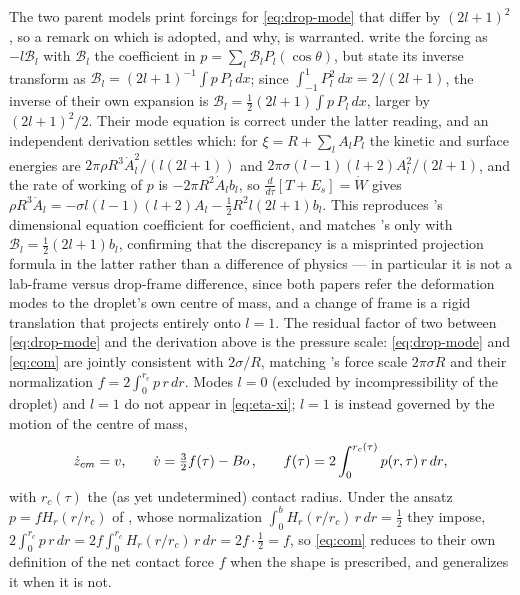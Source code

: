 The two parent models print forcings for \eqref{eq:drop-mode} that differ by $(2l+1)^2$, so a remark on which is adopted, and why, is warranted. \cite{AgueroEtAl2026} write the forcing as $-l\mathcal B_l$ with $\mathcal B_l$ the coefficient in $p=\sum_l\mathcal B_lP_l(\cos\theta)$, but state its inverse transform as $\mathcal B_l=(2l+1)^{-1}\int p\,P_l\,dx$; since $\int_{-1}^1P_l^2\,dx=2/(2l+1)$, the inverse of their own expansion is $\mathcal B_l=\tfrac12(2l+1)\int p\,P_l\,dx$, larger by $(2l+1)^2/2$. Their mode equation is correct under the latter reading, and an independent derivation settles which: for $\xi=R+\sum_lA_lP_l$ the kinetic and surface energies are $2\pi\rho R^3\dot A_l^2/(l(2l+1))$ and $2\pi\sigma(l-1)(l+2)A_l^2/(2l+1)$, and the rate of working of $p$ is $-2\pi R^2\dot A_lb_l$, so $\tfrac{d}{d\tau}[T+E_s]=\dot W$ gives $\rho R^3\ddot A_l=-\sigma l(l-1)(l+2)A_l-\tfrac12R^2l(2l+1)b_l$. This reproduces \cite{AlventosaEtAl2023}'s dimensional equation coefficient for coefficient, and matches \cite{AgueroEtAl2026}'s only with $\mathcal B_l=\tfrac12(2l+1)b_l$, confirming that the discrepancy is a misprinted projection formula in the latter rather than a difference of physics --- in particular it is not a lab-frame versus drop-frame difference, since both papers refer the deformation modes to the droplet's own centre of mass, and a change of frame is a rigid translation that projects entirely onto $l=1$. The residual factor of two between \eqref{eq:drop-mode} and the derivation above is the pressure scale: \eqref{eq:drop-mode} and \eqref{eq:com} are jointly consistent with $2\sigma/R$, matching \cite{AlventosaEtAl2023}'s force scale $2\pi\sigma R$ and their normalization $f=2\int_0^{r_c}p\,r\,dr$. Modes $l=0$ (excluded by incompressibility of the droplet) and $l=1$ do not appear in \eqref{eq:eta-xi}; $l=1$ is instead governed by the motion of the centre of mass,
\begin{equation}
    \dot z_{cm} = v\text{,}\qquad \dot v = \tfrac32 f(\tau) - B\kern-0.04em o\,\text{,}\qquad f(\tau) = 2\int_0^{r_c(\tau)} p(r,\tau)\, r\, dr\text{,}
    \label{eq:com}
\end{equation}
with $r_c(\tau)$ the (as yet undetermined) contact radius. Under the ansatz $p=fH_r(r/r_c)$ of \cite{AlventosaEtAl2023}, whose normalization $\int_0^b H_r(r/r_c)\,r\,dr=\tfrac12$ they impose, $2\int_0^{r_c}p\,r\,dr=2f\int_0^{r_c}H_r(r/r_c)\,r\,dr=2f\cdot\tfrac12=f$, so \eqref{eq:com} reduces to their own definition of the net contact force $f$ when the shape is prescribed, and generalizes it when it is not.

